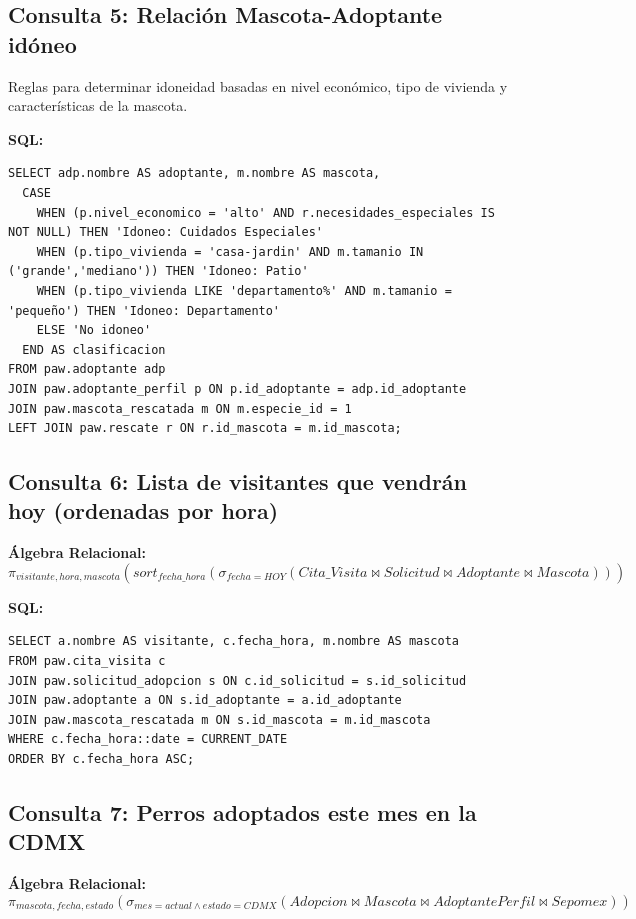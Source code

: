 \documentclass[12pt,a4paper]{article}
\begin{document}
\subsection*{Consulta 5: Relación Mascota-Adoptante idóneo}
Reglas para determinar idoneidad basadas en nivel económico, tipo de vivienda y características de la mascota.

\textbf{SQL:}
\begin{lstlisting}
SELECT adp.nombre AS adoptante, m.nombre AS mascota,
  CASE
    WHEN (p.nivel_economico = 'alto' AND r.necesidades_especiales IS NOT NULL) THEN 'Idoneo: Cuidados Especiales'
    WHEN (p.tipo_vivienda = 'casa-jardin' AND m.tamanio IN ('grande','mediano')) THEN 'Idoneo: Patio'
    WHEN (p.tipo_vivienda LIKE 'departamento%' AND m.tamanio = 'pequeño') THEN 'Idoneo: Departamento'
    ELSE 'No idoneo'
  END AS clasificacion
FROM paw.adoptante adp
JOIN paw.adoptante_perfil p ON p.id_adoptante = adp.id_adoptante
JOIN paw.mascota_rescatada m ON m.especie_id = 1
LEFT JOIN paw.rescate r ON r.id_mascota = m.id_mascota;
\end{lstlisting}

\subsection*{Consulta 6: Lista de visitantes que vendrán hoy (ordenadas por hora)}

\textbf{Álgebra Relacional:}
\[
\pi_{visitante, hora, mascota} (sort_{fecha\_hora} (\sigma_{fecha=HOY} (Cita\_Visita \bowtie Solicitud \bowtie Adoptante \bowtie Mascota)))
\]

\textbf{SQL:}
\begin{lstlisting}
SELECT a.nombre AS visitante, c.fecha_hora, m.nombre AS mascota
FROM paw.cita_visita c
JOIN paw.solicitud_adopcion s ON c.id_solicitud = s.id_solicitud
JOIN paw.adoptante a ON s.id_adoptante = a.id_adoptante
JOIN paw.mascota_rescatada m ON s.id_mascota = m.id_mascota
WHERE c.fecha_hora::date = CURRENT_DATE
ORDER BY c.fecha_hora ASC;
\end{lstlisting}

\subsection*{Consulta 7: Perros adoptados este mes en la CDMX}

\textbf{Álgebra Relacional:}
\[
\pi_{mascota, fecha, estado} (\sigma_{mes=actual \land estado=CDMX} (Adopcion \bowtie Mascota \bowtie AdoptantePerfil \bowtie Sepomex))
\]
\end{document}
